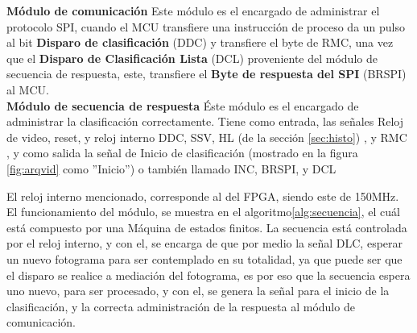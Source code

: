 \documentclass[twoside,spanish,ESP,MSc]{plantillaLabUPV}
\theoremstyle{definition}
\begin{document}
\checkmark\textbf{Módulo de comunicación}
Este módulo es el encargado de administrar el protocolo SPI, cuando el MCU transfiere una instrucción de proceso da un pulso al bit \textbf{Disparo de clasificación} (DDC) y transfiere el byte de RMC, una vez que el \textbf{Disparo de Clasificación Lista} (DCL) proveniente del módulo de secuencia de respuesta, este, transfiere el \textbf{Byte de respuesta del SPI} (BRSPI) al MCU.\\

\checkmark\textbf{Módulo de secuencia de respuesta}
Éste módulo es el encargado de administrar la clasificación correctamente. Tiene como entrada, las señales Reloj de video, reset, y reloj interno DDC, SSV, HL (de la sección \ref{sec:histo}) , y RMC , y como salida la señal de Inicio de clasificación (mostrado en la figura \ref{fig:arqvid} como ''Inicio'') o también llamado INC, BRSPI, y DCL 

El reloj interno mencionado, corresponde al del FPGA, siendo este de 150MHz. El funcionamiento del módulo, se muestra en el algoritmo\ref{alg:secuencia}, el cuál está compuesto por una Máquina de estados finitos. La secuencia está controlada por el reloj interno, y con el, se encarga de que por medio la señal DLC, esperar un nuevo fotograma para ser contemplado en su totalidad, ya que puede ser que el disparo se realice a mediación del fotograma, es por eso que la secuencia espera uno nuevo, para ser procesado, y con el, se genera la señal para el inicio de la clasificación, y la correcta administración de la respuesta al módulo de comunicación.  
\end{document}
